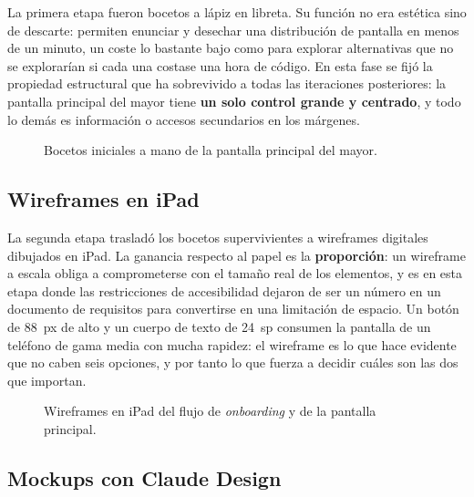 La primera etapa fueron bocetos a lápiz en libreta. Su función no era estética sino de descarte: permiten
enunciar y desechar una distribución de pantalla en menos de un minuto, un coste lo bastante bajo como
para explorar alternativas que no se explorarían si cada una costase una hora de código. En esta fase se
fijó la propiedad estructural que ha sobrevivido a todas las iteraciones posteriores: la pantalla
principal del mayor tiene \textbf{un solo control grande y centrado}, y todo lo demás es información o
accesos secundarios en los márgenes.

\begin{figure}[htbp]\centering
  \caption{Bocetos iniciales a mano de la pantalla principal del mayor.}
  \label{fig:boceto-libreta}
\end{figure}

\subsection{Wireframes en iPad}

La segunda etapa trasladó los bocetos supervivientes a wireframes digitales dibujados en iPad. La ganancia
respecto al papel es la \textbf{proporción}: un wireframe a escala obliga a comprometerse con el tamaño
real de los elementos, y es en esta etapa donde las restricciones de accesibilidad dejaron de ser un
número en un documento de requisitos para convertirse en una limitación de espacio. Un botón de 88~px de
alto y un cuerpo de texto de 24~sp consumen la pantalla de un teléfono de gama media con mucha rapidez:
el wireframe es lo que hace evidente que no caben seis opciones, y por tanto lo que fuerza a decidir
cuáles son las dos que importan.

\begin{figure}[htbp]\centering
  \caption{Wireframes en iPad del flujo de \emph{onboarding} y de la pantalla principal.}
  \label{fig:wireframes-ipad}
\end{figure}

\subsection{Mockups con Claude Design}

